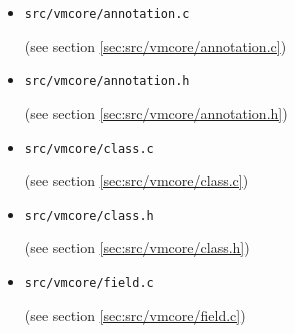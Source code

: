 \documentclass[a4paper, 10pt, titlepage]{scrartcl} %
\begin{document}
\begin{itemize}
 \item \begin{scriptsize}\verb|src|\hspace{0.0pt}\verb|/|\hspace{0.0pt}\verb|vmcore|\hspace{0.0pt}\verb|/|\hspace{0.0pt}\verb|annotation|\hspace{0.0pt}\verb|.|\hspace{0.0pt}\verb|c|\end{scriptsize} (see section \ref{sec:src/vmcore/annotation.c})
 \item \begin{scriptsize}\verb|src|\hspace{0.0pt}\verb|/|\hspace{0.0pt}\verb|vmcore|\hspace{0.0pt}\verb|/|\hspace{0.0pt}\verb|annotation|\hspace{0.0pt}\verb|.|\hspace{0.0pt}\verb|h|\end{scriptsize} (see section \ref{sec:src/vmcore/annotation.h})
 \item \begin{scriptsize}\verb|src|\hspace{0.0pt}\verb|/|\hspace{0.0pt}\verb|vmcore|\hspace{0.0pt}\verb|/|\hspace{0.0pt}\verb|class|\hspace{0.0pt}\verb|.|\hspace{0.0pt}\verb|c|\end{scriptsize} (see section \ref{sec:src/vmcore/class.c})
 \item \begin{scriptsize}\verb|src|\hspace{0.0pt}\verb|/|\hspace{0.0pt}\verb|vmcore|\hspace{0.0pt}\verb|/|\hspace{0.0pt}\verb|class|\hspace{0.0pt}\verb|.|\hspace{0.0pt}\verb|h|\end{scriptsize} (see section \ref{sec:src/vmcore/class.h})
 \item \begin{scriptsize}\verb|src|\hspace{0.0pt}\verb|/|\hspace{0.0pt}\verb|vmcore|\hspace{0.0pt}\verb|/|\hspace{0.0pt}\verb|field|\hspace{0.0pt}\verb|.|\hspace{0.0pt}\verb|c|\end{scriptsize} (see section \ref{sec:src/vmcore/field.c})

\end{itemize}
\end{document}
